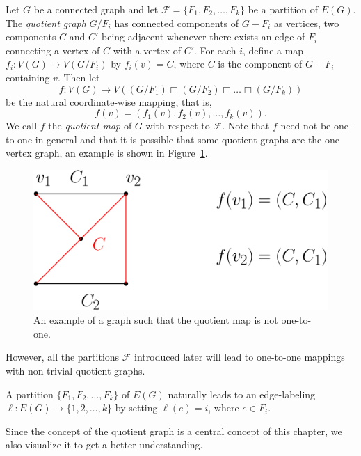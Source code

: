 \documentclass[12pt,a4paper,titlepage,openany]{report}
\begin{document}
Let $G$ be a connected graph and let $\mathcal{F}=\{F_1,F_2,\ldots, F_k\}$ be a partition of $E(G)$. The \textit{quotient graph} $G/ F_i$ has connected components of $G- F_i$ as vertices, two components $C$ and $C'$ being adjacent whenever there exists an edge of $F_i$ connecting a vertex of $C$ with a vertex of $C'$. For each $i$, define a map $f_i:V(G)\rightarrow V(G/ F_i)$ by $f_i(v)=C$, where $C$ is the component of $G- F_i$ containing $v$. Then let
$$f:V(G)\to V((G/ F_1) \Box (G/ F_2) \Box \ldots \Box (G/ F_k))$$
be the natural coordinate-wise mapping, that is,
$$f(v)=(f_1(v),f_2(v),\ldots , f_k(v)).$$
We call $f$ the \textit{quotient map} of $G$ with respect to $\mathcal{F}$. Note that $f$ need not be one-to-one in general and that it is possible that some quotient graphs are the one vertex graph, an example is shown in Figure~\ref{fnotonetoone}.

\begin{figure}[h]
\begin{center}
\includegraphics[width=0.65\linewidth]{figures/fnotonetoone.png}
\end{center}
\caption{An example of a graph such that the quotient map is not one-to-one.}\label{fnotonetoone}
\end{figure}

However, all the partitions $\mathcal{F}$ introduced later will lead to one-to-one mappings with non-trivial quotient graphs.

A partition $\{F_1,F_2,\ldots ,F_k\}$ of $E(G)$ naturally leads to an edge-labeling $\ell:E(G)\to \{1,2,\ldots,k\}$ by setting $\ell(e)=i$, where $e\in F_i$.

Since the concept of the quotient graph is a central concept of this chapter,
we also visualize it to get a better understanding.
\end{document}
